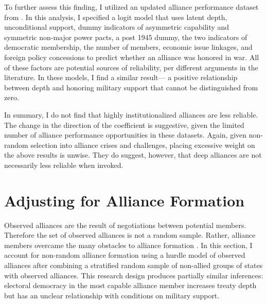\documentclass[12pt]{article}
\begin{document}
To further assess this finding, I utilized an updated alliance performance dataset from \citet{BerkemeierFuhrmann2018}.
In this analysis, I specified a logit model that uses latent depth, unconditional support, dummy indicators of asymmetric capability and symmetric non-major power pacts, a post 1945 dummy, the two indicators of democratic membership, the number of members, economic issue linkages, and foreign policy concessions to predict whether an alliance was honored in war. 
All of these factors are potential sources of reliability, per different arguments in the literature. 
In these models, I find a similar result--- a positive relationship between depth and honoring military support that cannot be distinguished from zero.


In summary, I do not find that highly institutionalized alliances are less reliable. 
The change in the direction of the coefficient is suggestive, given the limited number of alliance performance opportunities in these datasets. 
Again, given non-random selection into alliance crises and challenges, placing excessive weight on the above results is unwise. 
They do suggest, however, that deep alliances are not necessarily less reliable when invoked. 



\section{Adjusting for Alliance Formation}



Observed alliances are the result of negotiations between potential members. 
Therefore the set of observed alliances is not a random sample.
Rather, alliance members overcame the many obstacles to alliance formation \citep{Poast2019a}.  
In this section, I account for non-random alliance formation using a hurdle model of observed alliances after combining a stratified random sample of non-allied groups of states with observed alliances. 
This research design produces partially similar inferences: electoral democracy in the most capable alliance member increases treaty depth but has an unclear relationship with conditions on military support. 
\end{document}
